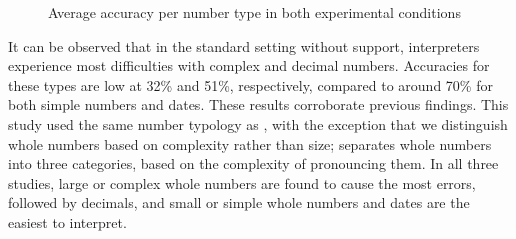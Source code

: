 \documentclass[output=paper]{langsci/langscibook}
\begin{document}
\begin{figure}
\caption{Average accuracy per number type in both experimental conditions\label{fig:01:2}}
\end{figure}

It can be observed that in the standard setting without support, interpreters experience most difficulties with complex and decimal numbers. Accuracies for these types are low at 32\% and 51\%, respectively, compared to around 70\% for both simple numbers and dates. These results corroborate previous findings. This study used the same number typology as \citet{Mazza2001}, with the exception that we distinguish whole numbers based on complexity rather than size; \citet{Pinochi2009} separates whole numbers into three categories, based on the complexity of pronouncing them. In all three studies, large or complex whole numbers are found to cause the most errors, followed by decimals, and small or simple whole numbers and dates are the easiest to interpret.
\end{document}
